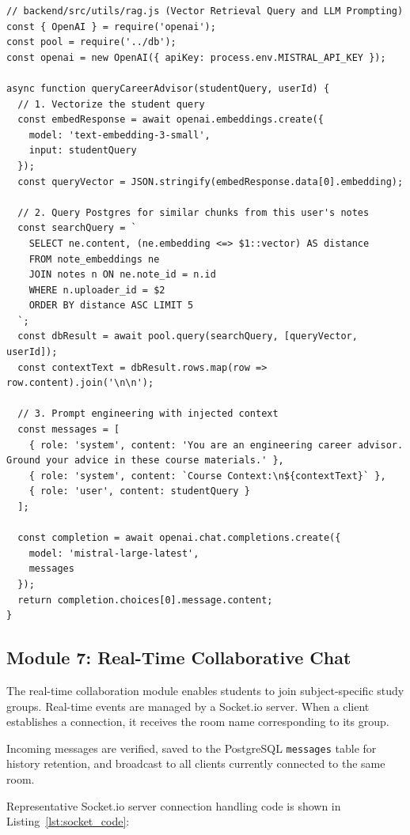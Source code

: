 \documentclass[12,Times new Roman,a4paper]{report}
\begin{document}
\begin{verbatim}
// backend/src/utils/rag.js (Vector Retrieval Query and LLM Prompting)
const { OpenAI } = require('openai');
const pool = require('../db');
const openai = new OpenAI({ apiKey: process.env.MISTRAL_API_KEY });

async function queryCareerAdvisor(studentQuery, userId) {
  // 1. Vectorize the student query
  const embedResponse = await openai.embeddings.create({
    model: 'text-embedding-3-small',
    input: studentQuery
  });
  const queryVector = JSON.stringify(embedResponse.data[0].embedding);

  // 2. Query Postgres for similar chunks from this user's notes
  const searchQuery = `
    SELECT ne.content, (ne.embedding <=> $1::vector) AS distance 
    FROM note_embeddings ne
    JOIN notes n ON ne.note_id = n.id
    WHERE n.uploader_id = $2
    ORDER BY distance ASC LIMIT 5
  `;
  const dbResult = await pool.query(searchQuery, [queryVector, userId]);
  const contextText = dbResult.rows.map(row => row.content).join('\n\n');

  // 3. Prompt engineering with injected context
  const messages = [
    { role: 'system', content: 'You are an engineering career advisor. Ground your advice in these course materials.' },
    { role: 'system', content: `Course Context:\n${contextText}` },
    { role: 'user', content: studentQuery }
  ];

  const completion = await openai.chat.completions.create({
    model: 'mistral-large-latest',
    messages
  });
  return completion.choices[0].message.content;
}
\end{verbatim}
\label{lst:rag_code}

\subsection{Module 7: Real-Time Collaborative Chat}

The real-time collaboration module enables students to join subject-specific study groups. Real-time events are managed by a Socket.io server. When a client establishes a connection, it receives the room name corresponding to its group. 

Incoming messages are verified, saved to the PostgreSQL \texttt{messages} table for history retention, and broadcast to all clients currently connected to the same room.

Representative Socket.io server connection handling code is shown in Listing~\ref{lst:socket_code}:
\end{document}
